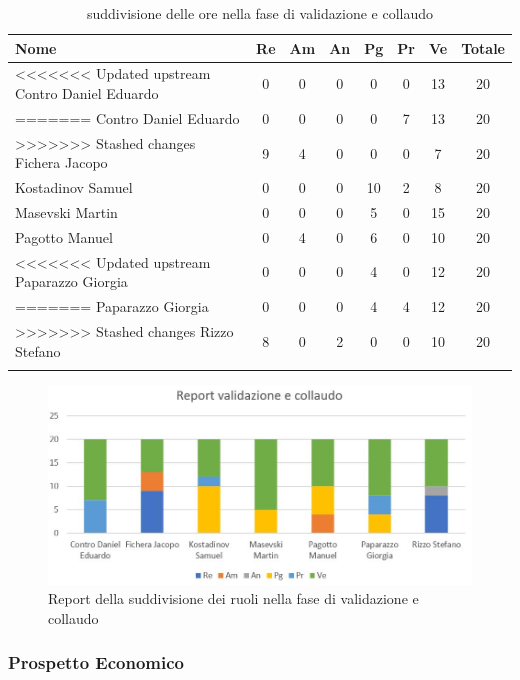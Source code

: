 \documentclass[../piano_di_progetto.tex]{subfiles}
\begin{document}
\begin{center}
	\begin{longtable}{|l|c|c|c|c|c|c|c|}
		\hline
		\rowcolor{lightgray}
		\textbf{Nome} & \textbf{Re} & \textbf{Am} & \textbf{An} & \textbf{Pg}  & \textbf{Pr}   & \textbf{Ve} & \textbf{Totale} \\

		\hline
<<<<<<< Updated upstream
			Contro Daniel Eduardo & 0 & 0 & 0 & 0 & 0 & 13 & 20\\
=======
			Contro Daniel Eduardo & 0 & 0 & 0 & 0 & 7 & 13 & 20\\
		\hline
>>>>>>> Stashed changes
			Fichera Jacopo & 9 & 4 & 0 & 0 & 0 & 7 & 20 \\ 
			Kostadinov Samuel & 0 & 0 & 0 & 10 & 2 & 8 & 20 \\ 		
			Masevski Martin & 0 & 0 & 0 & 5 & 0 & 15 & 20 \\
			Pagotto Manuel & 0 & 4 & 0 & 6 & 0 & 10 & 20 \\			
<<<<<<< Updated upstream
			Paparazzo Giorgia & 0 & 0 & 0 & 4 & 0 & 12 & 20 \\
=======
		\hline
			Paparazzo Giorgia & 0 & 0 & 0 & 4 & 4 & 12 & 20 \\
		\hline
>>>>>>> Stashed changes
			Rizzo Stefano & 8 & 0 & 2 & 0 & 0 & 10 & 20 \\
		\hline	
		\rowcolor{white}
		\caption{suddivisione delle ore nella fase di validazione e collaudo}
	\end{longtable}
\end{center}

\begin{figure}[H]
\centering
\includegraphics[width=12cm]{componenti/img/report_valid_collaudo}
\caption{Report della suddivisione dei ruoli nella fase di validazione e collaudo}
\end{figure}

\subsubsection{Prospetto Economico}
\end{document}
